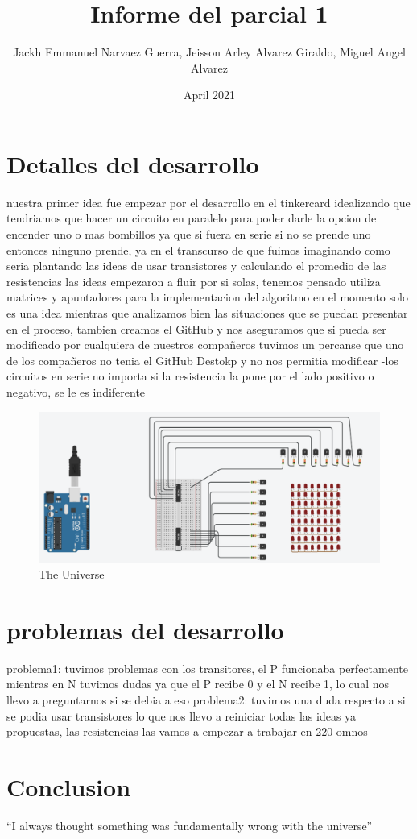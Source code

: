 \documentclass{article}
\title{Informe del parcial 1}
\author{Jackh Emmanuel Narvaez Guerra, Jeisson Arley Alvarez Giraldo, Miguel Angel Alvarez}
\date{April 2021}
\begin{document}
\maketitle

\section{Detalles del desarrollo}
nuestra primer idea fue empezar por el desarrollo en el tinkercard idealizando que tendriamos que hacer un circuito en paralelo para poder darle la opcion de encender uno o mas bombillos ya que si fuera en serie si no se prende uno entonces ninguno prende, ya en el transcurso de que fuimos imaginando como seria plantando las ideas de usar transistores y calculando el promedio de las resistencias las ideas empezaron a fluir por si solas, tenemos pensado utiliza matrices y apuntadores para la implementacion del algoritmo en el momento solo es una idea mientras que analizamos bien las situaciones que se puedan presentar en el proceso, tambien creamos el GitHub y nos aseguramos que si pueda ser modificado por cualquiera de nuestros compañeros tuvimos un percanse que uno de los compañeros no tenia el GitHub Destokp y no nos permitia modificar 
-los circuitos en serie no importa si la resistencia la pone por el lado positivo o negativo, se le es indiferente 

\begin{figure}[h!]
\centering
\includegraphics[scale=1.7]{imagen.png}
\caption{The Universe}
\label{fig:universe}
\end{figure}


\section{problemas del desarrollo}
problema1: tuvimos problemas con los transitores, el P funcionaba perfectamente mientras en N tuvimos dudas ya que el P recibe 0 y el N recibe 1, lo cual nos llevo a preguntarnos si se debia a eso
problema2: tuvimos una duda respecto a si se podia usar transistores lo que nos llevo a reiniciar todas las ideas ya propuestas, las resistencias las vamos a empezar a trabajar en 220 omnos
\section{Conclusion}
``I always thought something was fundamentally wrong with the universe'' \citep{adams1995hitchhiker}



\end{document}

